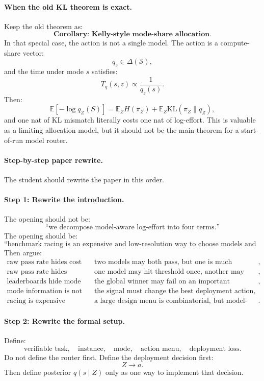 \documentclass{article}
\newcommand{\KL}{\mathrm{KL}}
\begin{document}
\paragraph{When the old KL theorem is exact.}
Keep the old theorem as:
\[
    \textbf{Corollary: Kelly-style mode-share allocation.}
\]
In that special case, the action is not a single model.
The action is a compute-share vector:
\[
    q_z\in\Delta(\mathcal S),
\]
and the time under mode \(s\) satisfies:
\[
    T_q(s,z)\propto \frac{1}{q_z(s)}.
\]
Then:
\[
    \mathbb E[-\log q_Z(S)]
    =
    \mathbb E_ZH(\pi_Z)+\mathbb E_Z\KL(\pi_Z\|q_Z),
\]
and one nat of KL mismatch literally costs one nat of log-effort.
This is valuable as a limiting allocation model, but it should not be the main theorem for
a start-of-run model router.

\paragraph{Step-by-step paper rewrite.}
The student should rewrite the paper in this order.

\paragraph{Step 1: Rewrite the introduction.}
The opening should not be:
\[
    \text{``we decompose model-aware log-effort into four terms.''}
\]
The opening should be:
\[
    \text{``benchmark racing is an expensive and low-resolution way to choose
    models and harnesses for verifier-backed agents.''}
\]
Then argue:
\[
\begin{array}{ll}
    \text{raw pass rate hides cost} &
    \text{two models may both pass, but one is much cheaper or faster},\\
    \text{raw pass rate hides persistence} &
    \text{one model may hit threshold once, another may stay above threshold},\\
    \text{leaderboards hide mode structure} &
    \text{the global winner may fail on an important submode},\\
    \text{mode information is not enough} &
    \text{the signal must change the best deployment action},\\
    \text{racing is expensive} &
    \text{a large design menu is combinatorial, but model-mode cells are reusable}.
\end{array}
\]

\paragraph{Step 2: Rewrite the formal setup.}
Define:
\[
    \text{verifiable task},\quad
    \text{instance},\quad
    \text{mode},\quad
    \text{action menu},\quad
    \text{deployment loss}.
\]
Do not define the router first.
Define the deployment decision first:
\[
    Z \longrightarrow a.
\]
Then define posterior \(q(s\mid Z)\) only as one way to implement that decision.
\end{document}
